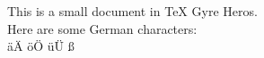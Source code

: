 \documentclass{article}
\begin{document}
This is a small document in TeX Gyre Heros.
\\
Here are some German characters:
\\
äÄ öÖ üÜ ß
\end{document}
